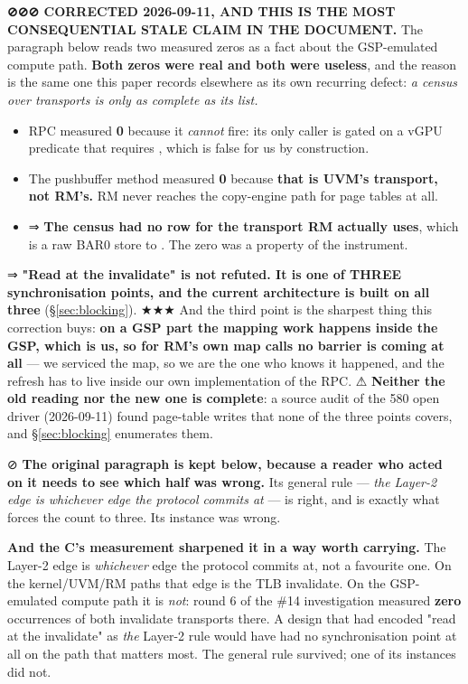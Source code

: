 \documentclass[10.5pt]{article}
\begin{document}
\begin{warnbox}\small
\textbf{⊘⊘⊘ CORRECTED 2026-09-11, AND THIS IS THE MOST CONSEQUENTIAL STALE CLAIM IN THE
DOCUMENT.} The paragraph below reads two measured zeros as a fact about the GSP-emulated compute
path. \textbf{Both zeros were real and both were useless}, and the reason is the same one this
paper records elsewhere as its own recurring defect: \emph{a census over transports is only as
complete as its list.}
\begin{itemize}\small
\item {} RPC  measured \textbf{0} because it \emph{cannot} fire:
  its only caller is gated on a vGPU predicate that requires , which is false
  for us by construction.
\item The   pushbuffer method measured \textbf{0} because
  \textbf{that is UVM's transport, not RM's.} RM never reaches the copy-engine path for page
  tables at all.
\item ⇒ \textbf{The census had no row for the transport RM actually uses}, which is a raw BAR0
  store to . The zero was a property of the instrument.
\end{itemize}
\smallskip
⇒ \textbf{"Read at the invalidate" is not refuted. It is one of THREE synchronisation points, and
the current architecture is built on all three} (\S\ref{sec:blocking}). ★★★ And the third point
is the sharpest thing this correction buys: \textbf{on a GSP part the mapping work happens inside
the GSP, which is us, so for RM's own map calls no barrier is coming at all} --- we serviced the
map, so we are the one who knows it happened, and the refresh has to live inside our own
implementation of the RPC. ⚠ \textbf{Neither the old reading nor the new one is complete}: a
source audit of the 580 open driver (2026-09-11) found page-table writes that none of the three
points covers, and \S\ref{sec:blocking} enumerates them.
\smallskip

⊘ \textbf{The original paragraph is kept below, because a reader who acted on it needs to see
which half was wrong.} Its general rule --- \emph{the Layer-2 edge is whichever edge the protocol
commits at} --- is right, and is exactly what forces the count to three. Its instance was wrong.
\end{warnbox}

\textbf{And the C's measurement sharpened it in a way worth carrying.} The Layer-2 edge is
\emph{whichever} edge the protocol commits at, not a favourite one. On the kernel/UVM/RM paths
that edge is the TLB invalidate. On the GSP-emulated compute path it is \emph{not}: round 6 of
the \#14 investigation measured \textbf{zero} occurrences of both invalidate transports there.
A design that had encoded "read at the invalidate" as \emph{the} Layer-2 rule would have had no
synchronisation point at all on the path that matters most. The general rule survived; one of
its instances did not.
\end{document}

